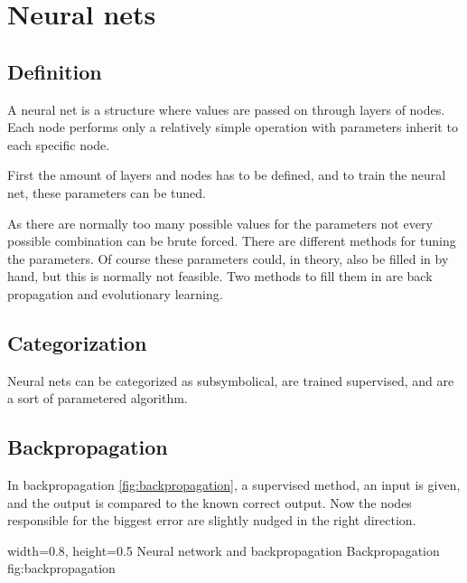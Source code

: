\section{Neural nets} 
\label{sec:NN}
\subsection{Definition} \cite[p727]{MA}
A neural net is a structure where values are passed on through layers of nodes. Each node performs only a relatively simple operation with parameters inherit to each specific node.

First the amount of layers and nodes has to be defined, and to train the neural net, these parameters can be tuned.

As there are normally too many possible values for the parameters not every possible combination can be brute forced. There are different methods for tuning the parameters. Of course these parameters could, in theory, also be filled in by hand, but this is normally not feasible. Two methods to fill them in are back propagation and evolutionary learning.

\subsection{Categorization}
Neural nets can be categorized as subsymbolical, are trained supervised, and are a sort of parametered algorithm.

\subsection{Backpropagation}
In backpropagation \ref{fig:backpropagation}, a supervised method, an input is given, and the output is compared to the known correct output. Now the nodes responsible for the biggest error are slightly nudged in the right direction. 

    {width=0.8\textwidth, height=0.5\textheight} %
    {Neural network and backpropagation}   %
    {Backpropagation}   %
    {fig:backpropagation}    %